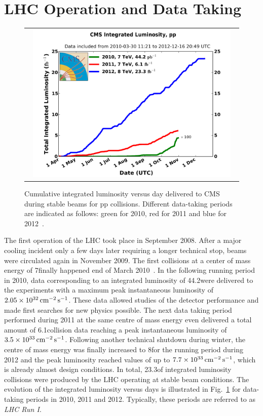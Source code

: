 \section{LHC Operation and Data Taking}
\label{sec:data}
\begin{figure}[!t]
  \centering
  \begin{tabular}{c}
    \includegraphics[width=0.95\textwidth]{figures/int_lumi_cumulative_pp_2.pdf}
  \end{tabular}
  \caption{Cumulative integrated luminosity versus day delivered to CMS during stable beams for pp collisions. Different data-taking periods are indicated as follows: green for 2010, red for 2011 and blue for 2012~\cite{bib:lhc:lumi12}.}
  \label{fig:lhc_data}
\end{figure}
The first operation of the LHC took place in September 2008. After a major cooling incident only a few days later requiring a longer technical stop, beams were circulated again in November 2009. The first collisions at a center of mass energy of 7\tev finally happened end of March 2010~\cite{bib:lhcmachineoutreach}. In the following running period in 2010, data corresponding to an integrated luminosity of 44.2\pbinv were delivered to the experiments with a maximum peak instantaneous luminosity of $2.05 \times 10^{32} \,\text{cm}^{-2} \,\text{s}^{-1}$. These data allowed studies of the detector performance and made first searches for new physics possible. The next data taking period performed during 2011 at the same centre of mass energy even delivered a total amount of 6.1\fbinv \pp collision data reaching a peak instantaneous luminosity of $3.5 \times 10^{33} \,\text{cm}^{-2} \,\text{s}^{-1}$. Following another technical shutdown during winter, the centre of mass energy was finally increased to 8\tev for the running period during 2012 and the peak luminosity reached values of up to $7.7 \times 10^{33} \,\text{cm}^{-2} \,\text{s}^{-1}$, which is already almost design conditions. In total, 23.3\fbinv of integrated luminosity \pp collisions were produced by the LHC operating at stable beam conditions. The evolution of the integrated luminosity versus days is illustrated in Fig.~\ref{fig:lhc_data} for data-taking periods in 2010, 2011 and 2012. Typically, these periods are referred to as \textit{LHC Run I}. \\
